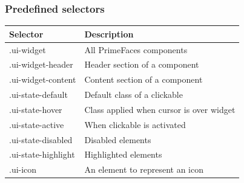 \documentclass[10pt,xcolor=pdflatex]{beamer}
\begin{document}
\begin{frame}\frametitle{Predefined selectors}
\begin{table}[]
\centering
\bgroup
\def\arraystretch{1.5}%
\begin{tabular}{|l|l|}
\hline
\textbf{Selector}    & \textbf{Description}                      \\ \hline
.ui-widget           & All PrimeFaces components                 \\ \hline
.ui-widget-header    & Header section of a component             \\ \hline
.ui-widget-content   & Content section of a component            \\ \hline
.ui-state-default    & Default class of a clickable              \\ \hline
.ui-state-hover      & Class applied when cursor is over widget  \\ \hline
.ui-state-active     & When clickable is activated               \\ \hline
.ui-state-disabled   & Disabled elements                         \\ \hline
.ui-state-highlight  & Highlighted elements                      \\ \hline
.ui-icon             & An element to represent an icon           \\ \hline
\end{tabular}
\egroup
\end{table}
\end{frame}
\end{document}
